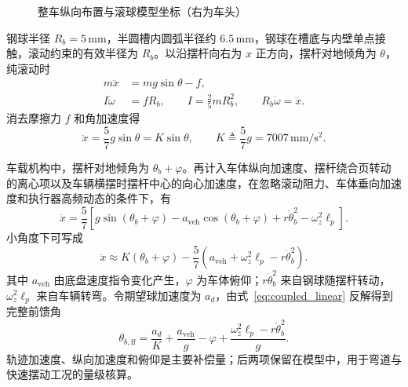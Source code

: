 \documentclass[12pt,a4paper]{ctexart}
\newcommand{\unit}[1]{\ensuremath{\,\mathrm{#1}}}
\newcommand{\chartnote}[1]{}
\begin{document}
\begin{figure}[H]
\caption{整车纵向布置与滚球模型坐标（右为车头）}
\label{fig:mechanics}
\chartnote{主图按静止名义姿态绘制：蓝色车体平板水平且 $\varphi=0$，摆杆由支撑台与舵机形成 $\theta_b$；运行时动态俯仰 $\varphi$ 只在平板下方用独立虚线角示意，不表示实际装配倾斜。球位相机由车身左、右两侧立杆悬在摆杆正上方，光轴竖直且不随摆杆倾斜；纵向侧视中将本应重合的两杆略作错开，仅用于表明左右各有一杆。监测图传相机属于独立监测链，本建模图不重复绘制。图中角度与尺寸仅作定义，不可按比例量取。}
\end{figure}

钢球半径 $R_b=5\unit{mm}$，半圆槽内圆弧半径约 $6.5\unit{mm}$，钢球在槽底与内壁单点接触，滚动约束的有效半径为 $R_b$。以沿摆杆向右为 $x$ 正方向，摆杆对地倾角为 $\theta$，纯滚动时
\begin{align}
 m\ddot x &= mg\sin\theta-f, \\
 I\dot\omega &= fR_b,\qquad I=\frac{2}{5}mR_b^2,\qquad R_b\dot\omega=\ddot x .
\end{align}
消去摩擦力 $f$ 和角加速度得
\begin{equation}
 \boxed{\ddot x=\frac{5}{7}g\sin\theta=K\sin\theta},\qquad
 K\triangleq\frac{5}{7}g=7007\unit{mm/s^2}.
\label{eq:ball}
\end{equation}

车载机构中，摆杆对地倾角为 $\theta_b+\varphi$。再计入车体纵向加速度、摆杆绕合页转动的离心项以及车辆横摆时摆杆中心的向心加速度，在忽略滚动阻力、车体垂向加速度和执行器高频动态的条件下，有
\begin{equation}
 \boxed{\ddot{x}=\frac{5}{7}\!\left[g\sin(\theta_b+\varphi)
 -a_{\mathrm{veh}}\cos(\theta_b+\varphi)
 +r\dot\theta_b^{2}-\omega_z^{2}\ell_p\right]} .
\label{eq:coupled}
\end{equation}
小角度下可写成
\begin{equation}
 \ddot x\approx K(\theta_b+\varphi)
 -\frac{5}{7}\left(a_{\mathrm{veh}}+\omega_z^2\ell_p-r\dot\theta_b^2\right).
\label{eq:coupled_linear}
\end{equation}
其中 $a_{\mathrm{veh}}$ 由底盘速度指令变化产生，$\varphi$ 为车体俯仰；$r\dot\theta_b^2$ 来自钢球随摆杆转动，$\omega_z^2\ell_p$ 来自车辆转弯。令期望球加速度为 $a_d$，由式~\eqref{eq:coupled_linear} 反解得到完整前馈角
\begin{equation}
 \theta_{b,\mathrm{ff}}=\frac{a_d}{K}+\frac{a_{\mathrm{veh}}}{g}-\varphi
 +\frac{\omega_z^2\ell_p-r\dot\theta_b^2}{g}.
\label{eq:feedforward}
\end{equation}
轨迹加速度、纵向加速度和俯仰是主要补偿量；后两项保留在模型中，用于弯道与快速摆动工况的量级核算。
\end{document}
